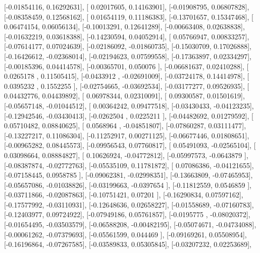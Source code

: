 \documentclass{article}
\begin{document}
       [-0.01854116,  0.16292631],
       [ 0.02017605,  0.14163901],
       [-0.01908795,  0.06807828],
       [-0.08358459,  0.12568162],
       [ 0.01654119,  0.11186383],
       [-0.13701657,  0.15347468],
       [ 0.06474154,  0.06056134],
       [-0.10013291,  0.12641289],
       [-0.00663408,  0.02638838],
       [-0.01632219,  0.03618388],
       [-0.14230594,  0.04052914],
       [ 0.05766947,  0.00833257],
       [-0.07614177,  0.07024639],
       [-0.02186092, -0.01860735],
       [-0.15030709,  0.17026888],
       [-0.16426612, -0.02368014],
       [-0.02194623,  0.07599558],
       [-0.17363897,  0.02334297],
       [-0.00185396,  0.04414578],
       [-0.00365701,  0.050076  ],
       [-0.06681637,  0.02410288],
       [ 0.0265178 ,  0.11505415],
       [-0.0433912 , -0.02691009],
       [-0.03724178,  0.14414978],
       [ 0.0395232 ,  0.1552255 ],
       [-0.02754665, -0.03692534],
       [-0.03177277,  0.09526935],
       [ 0.04432776,  0.04439892],
       [ 0.06978344,  0.02310091],
       [ 0.09300587,  0.01501619],
       [-0.05657148, -0.01044512],
       [ 0.00364242,  0.09477518],
       [-0.03430433, -0.04123235],
       [-0.12942546, -0.03430413],
       [-0.0262504 ,  0.0225211 ],
       [-0.04482692,  0.01279592],
       [ 0.05710482,  0.08840625],
       [ 0.0568964 , -0.04851807],
       [-0.07860287,  0.03111477],
       [-0.13227217,  0.11086304],
       [-0.11252917,  0.00271125],
       [-0.06677446,  0.01808651],
       [-0.00965282,  0.08445573],
       [-0.09956543,  0.07760817],
       [ 0.05491093, -0.02565104],
       [ 0.03098664,  0.08884827],
       [ 0.10626924, -0.04772812],
       [-0.05997573, -0.0643879 ],
       [-0.08387874, -0.02772763],
       [-0.05535109,  0.11781872],
       [ 0.07086386, -0.04121655],
       [-0.07158445,  0.0958785 ],
       [-0.09062381, -0.02998351],
       [-0.13663809, -0.07465953],
       [-0.05657086, -0.01038826],
       [-0.03199663, -0.0397654 ],
       [-0.11812559,  0.0546859 ],
       [-0.03711866, -0.02087863],
       [-0.10751421,  0.07201   ],
       [-0.16290834,  0.07597162],
       [-0.17577992, -0.03110931],
       [-0.12648636,  0.02658227],
       [-0.01558689, -0.07160783],
       [-0.12403977,  0.09724922],
       [-0.07949186,  0.05761857],
       [-0.0195775 , -0.08020372],
       [-0.01654495, -0.03503579],
       [-0.06588208, -0.00482195],
       [-0.05074671, -0.04734088],
       [-0.00061262, -0.07379693],
       [-0.05561599,  0.044469  ],
       [-0.09169261,  0.05508954],
       [-0.16196864, -0.07267585],
       [-0.03589833,  0.05305845],
       [-0.03207232,  0.02253689],
\end{document}
